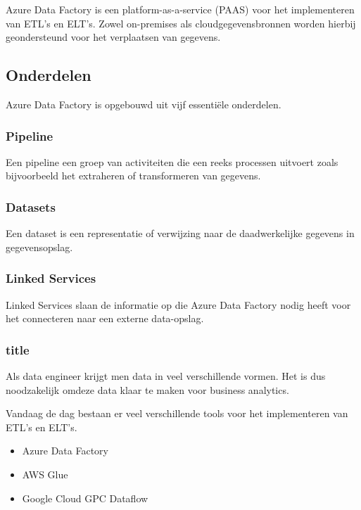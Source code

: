 Azure Data Factory is een platform-as-a-service (PAAS) voor het implementeren van ETL's en ELT's. Zowel on-premises als cloudgegevensbronnen worden hierbij geondersteund voor het verplaatsen van gegevens.~\autocite{Rawat2019} 

\subsection{Onderdelen}

Azure Data Factory is opgebouwd uit vijf essentiële onderdelen. 

\subsubsection{Pipeline}

Een pipeline een groep van activiteiten die een reeks processen uitvoert zoals bijvoorbeeld het extraheren of transformeren van gegevens.

\subsubsection{Datasets}

Een dataset is een representatie of verwijzing naar de daadwerkelijke gegevens in gegevensopslag.

\subsubsection{Linked Services}

Linked Services slaan de informatie op die Azure Data Factory nodig heeft voor het connecteren naar een externe data-opslag.

\subsubsection{title}








Als data engineer krijgt men data in veel verschillende vormen. Het is dus noodzakelijk omdeze data klaar te maken voor business analytics.

Vandaag de dag bestaan er veel verschillende tools voor het implementeren van ETL's en ELT's. 

\label{sec:toepassing-etl}

\begin{itemize}
    \item Azure Data Factory
    \item AWS Glue
    \item Google Cloud GPC Dataflow
    
\end{itemize}


